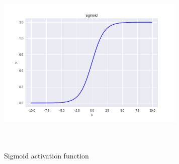 \begin{figure}[!ht]
    \centering
    \captionsetup{justification=centering,margin=2cm}
    \includegraphics[width=9cm, height=9cm, keepaspectratio]{pics/sigmoid_10.png}
    \caption{Sigmoid activation function}
    \label{fig:sigmoidActivation}
\end{figure}

